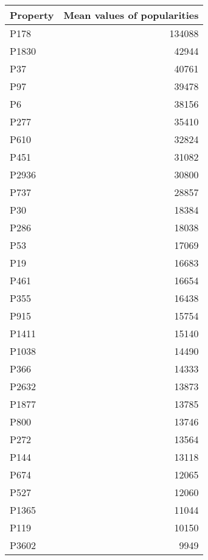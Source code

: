 \begin{tabular}{lr}
\toprule
Property &  Mean values of popularities \\
\midrule
    P178 &                       134088 \\
   P1830 &                        42944 \\
     P37 &                        40761 \\
     P97 &                        39478 \\
      P6 &                        38156 \\
    P277 &                        35410 \\
    P610 &                        32824 \\
    P451 &                        31082 \\
   P2936 &                        30800 \\
    P737 &                        28857 \\
     P30 &                        18384 \\
    P286 &                        18038 \\
     P53 &                        17069 \\
     P19 &                        16683 \\
    P461 &                        16654 \\
    P355 &                        16438 \\
    P915 &                        15754 \\
   P1411 &                        15140 \\
   P1038 &                        14490 \\
    P366 &                        14333 \\
   P2632 &                        13873 \\
   P1877 &                        13785 \\
    P800 &                        13746 \\
    P272 &                        13564 \\
    P144 &                        13118 \\
    P674 &                        12065 \\
    P527 &                        12060 \\
   P1365 &                        11044 \\
    P119 &                        10150 \\
   P3602 &                         9949 \\

\end{tabular}
